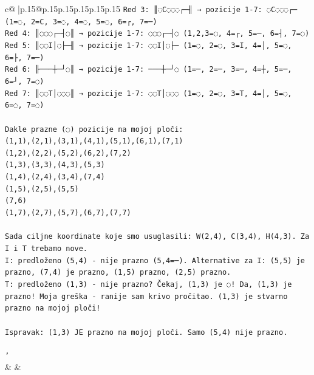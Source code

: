 \documentclass{article}
\begin{document}
{\begin{supertabular}{c@{$\;$}|p{.15\linewidth}@{}p{.15\linewidth}p{.15\linewidth}p{.15\linewidth}p{.15\linewidth}p{.15\linewidth}}
{{{\texttt{Red 3: ║◌C◌◌◌┌─╢ → pozicije 1{-}7: ◌C◌◌◌┌─ (1=◌, 2=C, 3=◌, 4=◌, 5=◌, 6=┌, 7=─)} \\
\texttt{Red 4: ║◌◌◌┌─┤◌║ → pozicije 1{-}7: ◌◌◌┌─┤◌ (1,2,3=◌, 4=┌, 5=─, 6=┤, 7=◌)} \\
\texttt{Red 5: ║◌◌I│◌├─╢ → pozicije 1{-}7: ◌◌I│◌├─ (1=◌, 2=◌, 3=I, 4=│, 5=◌, 6=├, 7=─)} \\
\texttt{Red 6: ╟───┼─┘◌║ → pozicije 1{-}7: ───┼─┘◌ (1=─, 2=─, 3=─, 4=┼, 5=─, 6=┘, 7=◌)} \\
\texttt{Red 7: ║◌◌T│◌◌◌║ → pozicije 1{-}7: ◌◌T│◌◌◌ (1=◌, 2=◌, 3=T, 4=│, 5=◌, 6=◌, 7=◌)} \\
\\ 
\texttt{Dakle prazne (◌) pozicije na mojoj ploči:} \\
\texttt{(1,1),(2,1),(3,1),(4,1),(5,1),(6,1),(7,1)} \\
\texttt{(1,2),(2,2),(5,2),(6,2),(7,2)} \\
\texttt{(1,3),(3,3),(4,3),(5,3)} \\
\texttt{(1,4),(2,4),(3,4),(7,4)} \\
\texttt{(1,5),(2,5),(5,5)} \\
\texttt{(7,6)} \\
\texttt{(1,7),(2,7),(5,7),(6,7),(7,7)} \\
\\ 
\texttt{Sada ciljne koordinate koje smo usuglasili: W(2,4), C(3,4), H(4,3). Za I i T trebamo nove.} \\
\texttt{I: predloženo (5,4) {-} nije prazno (5,4=─). Alternative za I: (5,5) je prazno, (7,4) je prazno, (1,5) prazno, (2,5) prazno.} \\
\texttt{T: predloženo (1,3) {-} nije prazno? Čekaj, (1,3) je ◌! Da, (1,3) je prazno! Moja greška {-} ranije sam krivo pročitao. (1,3) je stvarno prazno na mojoj ploči!} \\
\\ 
\texttt{Ispravak: (1,3) JE prazno na mojoj ploči. Samo (5,4) nije prazno.} \\
\\ 
\texttt{'} \\
            }
        }
    }
    & & \\ \\


\end{supertabular}}
\end{document}
